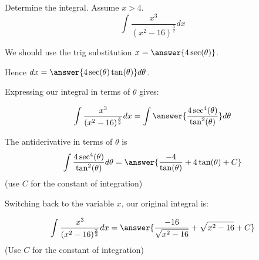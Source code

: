 \documentclass{ximera}
\author{Jason Miller}
\begin{document}
\begin{exercise}
Determine the integral. Assume $x > 4$. 
\[
\int \frac{x^3}{(x^2-16)^{\frac{3}{2}}}  dx
\]

We should use the trig substitution $x=\answer{4\sec(\theta)}$. 

Hence $dx=\answer{4 \sec(\theta)\tan(\theta) } d\theta$.

Expressing our integral in terms of $\theta$ gives:

\begin{exercise}

\[
\int \frac{x^{3}}{(x^{2}-16)^{\frac{3}{2}}} dx =\int \answer{ \frac{4 \sec^{4}(\theta)}{\tan^{2}(\theta)} } d\theta
\]


\begin{exercise}
The antiderivative in terms of $\theta$ is 
\[
\int  \frac{4 \sec^{4}(\theta)}{\tan^{2}(\theta)}  d\theta =\answer{  \frac{-4}{\tan(\theta)} + 4\tan(\theta)  +C  } 
\]
(use $C$ for the constant of integration)

\begin{exercise}
Switching back to the variable $x$, our original integral is:

\[
\int \frac{x^{3}}{(x^{2}-16)^{\frac{3}{2}}} dx= \answer{\frac{-16}{\sqrt{x^{2}-16}} + \sqrt{x^{2}-16} + C }
\]
(Use $C$ for the constant of integration)

\end{exercise}
\end{exercise}
\end{exercise}
\end{exercise}
\end{document}
